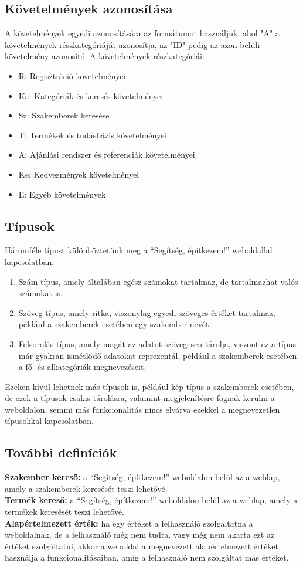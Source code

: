\subsection{Követelmények azonosítása}
A követelmények egyedi azonosítására az  formátumot használjuk, ahol "A" a követelmények részkategóriáját azonosítja, az "ID" pedig az azon belüli követelmény azonosító.
A követelmények részkategóriái:
\begin{itemize}
    \item R: Regisztráció követelményei
    \item Ka: Kategóriák és keresés követelményei
    \item Sz: Szakemberek keresése
    \item T: Termékek és tudásbázis követelményei
    \item A: Ajánlási rendszer és referenciák követelményei
    \item Ke: Kedvezmények követelményei
    \item E: Egyéb követelmények
\end{itemize}

\subsection{Típusok}
Háromféle típust különböztetünk meg a “Segítség, építkezem!” weboldallal kapcsolatban:
\begin{enumerate}
    \item Szám típus, amely általában egész számokat tartalmaz, de tartalmazhat valós számokat is.
    \item Szöveg típus, amely ritka, viszonylag egyedi szöveges értéket tartalmaz, például a szakemberek esetében egy szakember nevét.
    \item Felsorolás típus, amely magát az adatot szövegesen tárolja, viszont ez a típus már gyakran ismétlődő adatokat reprezentál, például a szakemberek esetében a fő- és alkategóriák megnevezéseit.
\end{enumerate}

Ezeken kívül lehetnek más típusok is, például kép típus a szakemberek esetében, de ezek a típusok csakis tárolásra, valamint megjelenítésre fognak kerülni a weboldalon, semmi más funkcionalitás nincs elvárva ezekkel a megnevezetlen típusokkal kapcsolatban.


\subsection{További definíciók}
\textbf{Szakember kereső:} a “Segítség, építkezem!” weboldalon belül az a weblap, amely a szakemberek keresését teszi lehetővé.\\
\textbf{Termék kereső:} a “Segítség, építkezem!” weboldalon belül az a weblap, amely a termékek keresését teszi lehetővé.\\
\textbf{Alapértelmezett érték:} ha egy értéket a felhasználó szolgáltatna a weboldalnak, de a felhasználó még nem tudta, vagy még nem akarta ezt az értéket szolgáltatni, akkor a weboldal a megnevezett alapértelmezett értéket használja a funkcionalitásaiban, amíg a felhasználó nem szolgáltat más értéket.

